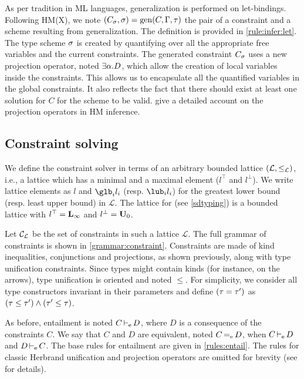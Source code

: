 As per tradition in ML languages, generalization is performed
on let-bindings.
Following HM(X), we note $(C_\sigma, \sigma) = \operatorname{\text{gen}}(C,\Gamma,\tau)$
the pair of a constraint and a scheme resulting from
generalization. The definition is provided in \cref{rule:infer:let}.
The type scheme $\sigma$ is created by quantifying over all the appropriate
free variables and the current constraints.
The generated constraint $C_\sigma$ uses a new projection operator,
noted $\exists \alpha.D$, which
allow the creation of local variables inside the constraints.
This allows us to encapsulate all the quantified variables in the global constraints.
It also reflects the fact that there
should exist at least one solution for $C$ for the scheme to be valid.
\citet{DBLP:journals/tapos/OderskySW99} give a detailed account
on the projection operators in HM inference.


\subsection{Constraint solving}
\label{infer:solving}

\newcommand\A{\mathcal A}
\newcommand\SC{\mathcal S}

We define the constraint solver in terms of an arbitrary bounded
lattice $(\mathcal L, \leq_\mathcal L)$, i.e.,
a lattice which has a minimal and a maximal element ($l^\top$ and $l^\bot$).
We write lattice elements as $l$ and $\glb_i l_i$ (resp. $\lub_i l_i$)
for the greatest lower bound (resp. least upper bound) in $\mathcal L$.
The lattice for \lang (see \cref{sdtyping}) is a bounded lattice with
$l^\top = \mathbf{L}_\infty$ and $l^\bot = \mathbf{U}_0$.

Let ${\mathcal C_{\mathcal L}}$ be the set of constraints in such a lattice $\mathcal L$.
The full grammar of constraints is shown in \cref{grammar:constraint}.
Constraints are made of kind inequalities, conjunctions and
projections, as shown previously, along with type unification
constraints. Since types might contain kinds (for instance, on the arrows),
type unification is oriented and noted $\leq$.
For simplicity, we consider all type constructors
invariant in their parameters
and define $(\tau = \tau')$ as $(\tau \leq \tau') \wedge (\tau' \leq \tau)$.

As before, entailment is noted $C \operatorname{\vdash_e} D$,
where $D$ is a consequence of the constraints $C$.
We say that $C$ and $D$ are equivalent, noted $C \operatorname{=_e} D$,
when $C \operatorname{\vdash_e} D$ and $D \operatorname{\vdash_e} C$.
The base rules for entailment are given in \cref{rules:entail}.
The rules for classic Herbrand unification and
projection operators are omitted for brevity (see
\citep{DBLP:journals/tapos/OderskySW99} for
details).

